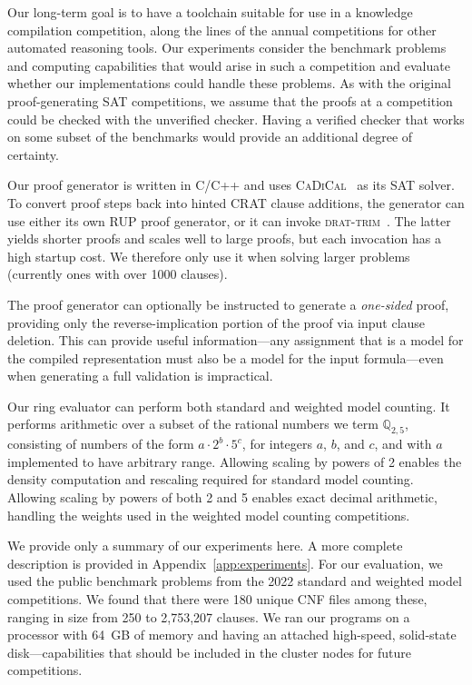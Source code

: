 \documentclass[letterpaper,USenglish,cleveref, autoref, thm-restate]{lipics-v2021}
\newcommand{\drational}{\mathbb{Q}_{2,5}}
\newcommand{\progname}[1]{\textsc{#1}}
\newcommand{\cadical}{\progname{CaDiCal}}
\newcommand{\dtrim}{\progname{drat-trim}}
\begin{document}
Our long-term goal is to have a toolchain suitable for use in a
knowledge compilation competition, along the lines of the annual
competitions for other automated reasoning tools.  Our experiments
consider the benchmark problems and computing capabilities that would
arise in such a competition and evaluate whether our implementations
could handle these problems.  As with the original proof-generating
SAT competitions, we assume that the proofs at a competition could be
checked with the unverified checker.  Having a verified checker
that works on some subset of the benchmarks would provide an
additional degree of certainty.

Our proof generator is written in C/C++ and uses
\cadical{}~\cite{biere-cadical-2019} as its SAT solver.  To convert
proof steps back into hinted CRAT clause additions, the generator can
use either its own RUP proof generator, or it can invoke
\dtrim{}~\cite{RAT}.  The latter yields shorter proofs and scales well
to large proofs, but each invocation has a high startup cost.  We
therefore only use it when solving larger problems (currently ones
with over 1000 clauses).

The proof generator can optionally be instructed to generate a {\em
one-sided} proof, providing only the reverse-implication portion of the proof via
input clause deletion.  This can provide useful information---any
assignment that is a model for the compiled representation
must also be a model for the input formula---even when generating a
full validation is impractical.

Our ring evaluator can perform both standard and weighted model
counting.  It performs arithmetic over a subset of the rational
numbers we term $\drational$, consisting of numbers of the form
$a \cdot 2^{b} \cdot 5^{c}$, for integers $a$, $b$, and $c$, and
with $a$ implemented to have arbitrary range.
Allowing scaling by powers of 2 enables the density computation
and rescaling required for standard model counting.  Allowing scaling
by powers of both 2 and 5 enables exact decimal arithmetic, handling
the weights used in the weighted model counting competitions.

We provide only a summary of our experiments here.  A more complete
description is provided in Appendix~\ref{app:experiments}\@. For our
evaluation, we used the public benchmark problems from the 2022
standard and weighted model competitions.  We found that there were
180 unique CNF files among these, ranging in size from 250 to
2,753,207 clauses.  We ran our programs on a processor with 64~GB of
memory and having an attached high-speed, solid-state
disk---capabilities that should be included in the cluster nodes for
future competitions.
\end{document}
